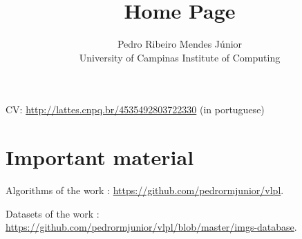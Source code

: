 \documentclass{article}
\title{Home Page}
\author{Pedro Ribeiro Mendes J{\'u}nior\\University of Campinas \textemdash{} Institute of Computing}
\begin{document}
\nocite{Penatti2015}
\nocite{Pazinato2015}
\nocite{MendesJr2011}

\maketitle

CV: \url{http://lattes.cnpq.br/4535492803722330} (in portuguese)


\section{Important material}
\label{sec:important-material}

Algorithms of the work \cite{MendesJr2011}: \url{https://github.com/pedrormjunior/vlpl}.

Datasets of the work \cite{MendesJr2011}: \url{https://github.com/pedrormjunior/vlpl/blob/master/imgs-database}.



\end{document}
